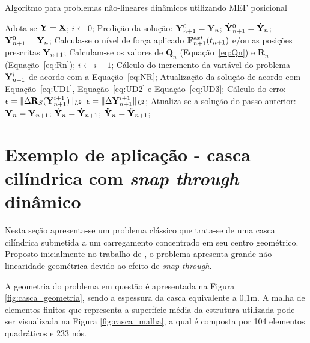 \begin{algorithm}[H]
	\caption{Algoritmo para problemas não-lineares dinâmicos utilizando MEF posicional}
	\label{alg:algoritmo_solid}
	\begin{algorithmic}[1]
		\State Adota-se $\mathbf{Y} = \mathbf{X}$;
		\State $i \gets 0$;
		\State Predição da solução:
		\State $\mathbf{Y}_{n+1}^{0} = \mathbf{Y}_{n}$;
		\State $\dot{\mathbf{Y}}_{n+1}^{0} = \dot{\mathbf{Y}}_{n}$;
		\State $\ddot{\mathbf{Y}}_{n+1}^{0} = \ddot{\mathbf{Y}}_{n}$;
		\State Calcula-se o nível de força aplicado $\mathbf{F}^{ext}_{n+1}(t_{n+1})$ e/ou as posições prescritas $\mathbf{Y}_{n+1}$;
		\State Calculam-se os valores de $\mathbf{Q}_n$ (Equação~\eqref{eq:Qn}) e $\mathbf{R}_n$ (Equação~\eqref{eq:Rn});
		\State $i \gets i + 1$;
		\State Cálculo do incremento da variável do problema $\mathbf{Y}_{n+1}^{i}$ de acordo com a Equação~\eqref{eq:NR};
		\State Atualização da solução de acordo com Equação~\eqref{eq:UD1}, Equação~\eqref{eq:UD2} e Equação~\eqref{eq:UD3};
		\State Cálculo do erro:
		\State $\epsilon = \lVert \Delta\mathbf{R}_S(\mathbf{Y}_{n+1}^{i+1}) \rVert_{L^2}$  $\epsilon = \lVert \Delta\mathbf{Y}_{n+1}^{i+1} \rVert_{L^2}$;
		\EndWhile
		\State Atualiza-se a solução do passo anterior:
		\State $\mathbf{Y}_{n} = \mathbf{Y}_{n+1}$;
		\State $\dot{\mathbf{Y}}_{n} = \dot{\mathbf{Y}}_{n+1}$;
		\State $\ddot{\mathbf{Y}}_{n} = \ddot{\mathbf{Y}}_{n+1}$;
		\EndFor
	\end{algorithmic}
\end{algorithm}

\section{Exemplo de aplicação - casca cilíndrica com \textit{snap through} dinâmico}

Nesta seção apresenta-se um problema clássico que trata-se de uma casca cilíndrica submetida a um carregamento concentrado em seu centro geométrico. Proposto inicialmente no trabalho de 
, o problema apresenta grande não-linearidade geométrica devido ao efeito de \textit{snap-through}. 

A geometria do problema em questão é apresentada na Figura \ref{fig:casca_geometria}, sendo a espessura da casca equivalente a 0,1m.  A malha de elementos finitos que representa a superfície média da estrutura utilizada pode ser visualizada na Figura \ref{fig:casca_malha}, a qual é composta por 104 elementos quadráticos e 233 nós. 

